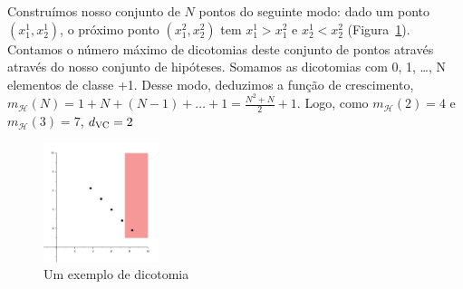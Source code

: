     Construímos nosso conjunto de $N$ pontos do seguinte modo: dado um ponto $(x_1^1, x_2^1)$, o próximo ponto $(x_1^2, x_2^2)$ tem $x_1^1 > x_1^2$ e $x_2^1 < x_2^2$ (Figura~\ref{fig:ex15b}). Contamos o número máximo de dicotomias deste conjunto de pontos através através do nosso conjunto de hipóteses. Somamos as dicotomias com 0, 1, \ldots, N elementos de classe +1. Desse modo, deduzimos a função de crescimento, $m_{\mathcal{H}}(N) = 1+N+(N-1)+\ldots+1=\frac{N^2+N}{2}+1$. Logo, como $m_{\mathcal{H}}(2)=4$ e $m_{\mathcal{H}}(3)=7$, $d_{\text{VC}}=2$
    \begin{figure}[h]
	    \includegraphics[width=0.3\textwidth]{ex15b}
	    \caption{Um exemplo de dicotomia}
	    \label{fig:ex15b}
    \end{figure}


